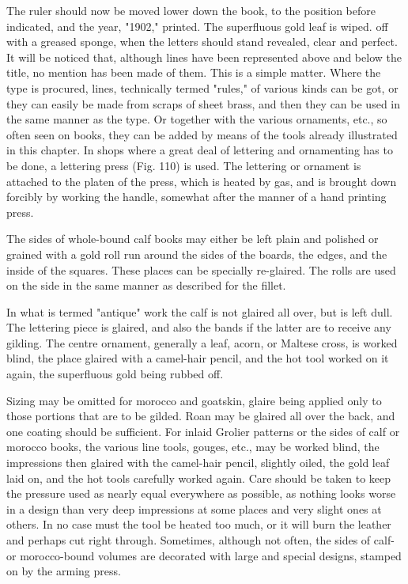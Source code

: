 \documentclass[twoside]{book}
\begin{document}
The ruler should now be moved lower down the
book, to the position before indicated, and the year,
"1902," printed. The superfluous gold leaf is wiped.
off with a greased sponge, when the letters should
stand revealed, clear and perfect. It will be noticed
that, although lines have been represented above
and below the title, no mention has been made of
them. This is a simple matter. Where the type
\pagebreak
is procured, lines, technically termed "rules," of
various kinds can be got, or they can easily be made
from scraps of sheet brass, and then they can be
used in the same manner as the type. Or together
with the various ornaments, etc., so often seen on
books, they can be added by means of the tools
already illustrated in this chapter.
In shops where a great deal of lettering and
ornamenting has to be done, a lettering press (Fig.
110) is used. The lettering or ornament is attached
to the platen of the press, which is heated by gas,
and is brought down forcibly by working the handle,
somewhat after the manner of a hand printing press.

The sides of whole-bound calf books may either
be left plain and polished or grained with a gold
roll run around the sides of the boards, the edges,
and the inside of the squares. These places can be
specially re-glaired. The rolls are used on the side
in the same manner as described for the fillet.

In what is termed "antique" work the calf is
not glaired all over, but is left dull. The lettering
piece is glaired, and also the bands if the latter
are to receive any gilding. The centre ornament,
generally a leaf, acorn, or Maltese cross, is worked
blind, the place glaired with a camel-hair pencil,
and the hot tool worked on it again, the superfluous
gold being rubbed off.

Sizing may be omitted for morocco and goatskin,
glaire being applied only to those portions that are
to be gilded. Roan may be glaired all over the back,
and one coating should be sufficient. For
inlaid Grolier patterns or the sides of calf or
morocco books, the various line tools, gouges, etc.,
may be worked blind, the impressions then glaired
with the camel-hair pencil, slightly oiled, the gold
leaf laid on, and the hot tools carefully worked
again. Care should be taken to keep the pressure
used as nearly equal everywhere as possible, as
nothing looks worse in a design than very deep
\pagebreak
impressions at some places and very slight ones at
others. In no case must the tool be heated too
much, or it will burn the leather and perhaps cut
right through. Sometimes, although not often, the
sides of calf- or morocco-bound volumes are decorated
with large and special designs, stamped on by the
arming press.
\end{document}
